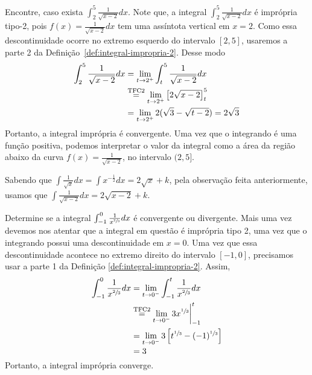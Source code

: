 \begin{example}
  Encontre, caso exista
  \(\int_{2}^5 \frac{1}{\sqrt{x-2}} dx\).
  \solution
  Note que, a integral
  \(\int_{2}^5 \frac{1}{\sqrt{x-2}} dx\) é imprópria tipo-2, pois
  \(f(x) =\frac{1}{\sqrt{x-2}} dx\) tem uma assíntota vertical em $x=2$.
  Como essa descontinuidade ocorre no extremo esquerdo do intervalo $[2, 5]$,
  usaremos a parte 2 da Definição~\ref{def:integral-impropria-2}. Desse modo
  \begin{align*}
    \int_{2}^5 \frac{1}{\sqrt{x-2}} dx
    & = \lim_{t \to 2^{+}} \int_{t}^5 \frac{1}{\sqrt{x-2}} dx  \\
    &\stackrel{\text{\scriptsize TFC2}}{=} \lim_{t \to 2^{+}} \left[ 2 \sqrt{x-2} \right]_t^5 \\
    & = \lim_{t \to 2^{+}}2(\sqrt{3}-\sqrt{t-2})= 2\sqrt{3}
  \end{align*}
  Portanto, a integral imprópria é convergente. Uma vez que o integrando
  é uma função positiva, podemos interpretar o valor da integral como a
  área da região abaixo da curva $f(x)=\frac{1}{\sqrt{x-2}}$,
  no intervalo $(2, 5]$.

  Sabendo que
  \(\int \frac{1}{\sqrt{x}}dx= \int x^{-\frac{1}{2}}dx = 2\sqrt{x}+k\),
  pela observação feita anteriormente, usamos que
  \(\int \frac{1}{\sqrt{x-2}}dx= 2\sqrt{x-2}+k\).
\end{example}

\begin{example}
  Determine se a integral
  \(\int_{-1}^{0} \frac{1}{x^{\sfrac{2}{3}}}dx\)
  é convergente ou divergente.
  \solution
  Mais uma vez devemos nos atentar que a integral em questão é imprópria tipo 2,
  uma vez que o integrando possui uma descontinuidade em $x=0$.
  Uma vez que essa descontinuidade acontece no extremo direito do intervalo
  $[-1, 0]$, precisamos usar a parte 1 da Definição \ref{def:integral-impropria-2}.
  Assim,
  \begin{align*}
    \int_{-1}^{0} \frac{1}{x^{\sfrac{2}{3}}}dx
    & = \lim_{t \to 0^{-}}
        \int_{-1}^{t}
        \frac{1}{x^{\sfrac{2}{3}}}dx  \\
    & \stackrel{\text{\scriptsize TFC2}}{=}
      \lim_{t \to 0^{-}}
      3x^{\sfrac{1}{3}} \bigg\rvert_{-1}^{t} \\
    & = \lim_{t \to 0^{-}}
      3 \left[ t^{\sfrac{1}{3}} - (-1)^{\sfrac{1}{3}} \right] \\
    & = 3
  \end{align*}
  Portanto, a integral imprópria converge.
\end{example}

